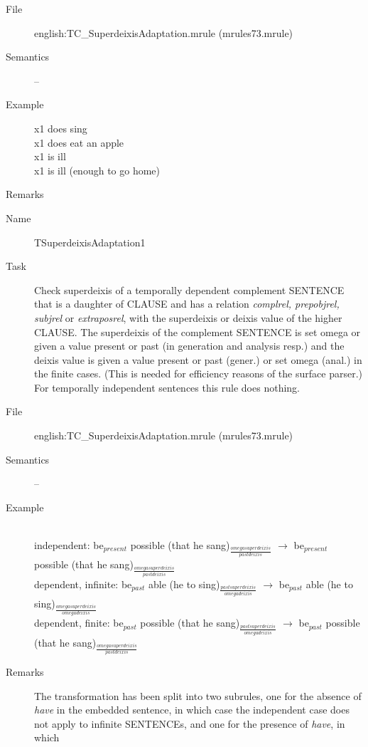 \begin{description}
\begin{description}
\item[File] english:TC\_SuperdeixisAdaptation.mrule (mrules73.mrule)
\item[Semantics] --
\item[Example] x1 does sing\\
x1 does eat an apple\\
x1 is ill\\
x1 is ill (enough to go home)
\item[Remarks] 
\end{description}

\vspace{1 cm}
\begin{description}
\item[Name] TSuperdeixisAdaptation1
\item[Task] 
Check superdeixis of a temporally dependent complement SENTENCE that is a 
daughter of CLAUSE and has a relation {\em complrel, prepobjrel, subjrel\/} or 
{\em extraposrel}, with the superdeixis or deixis value of the higher CLAUSE.
The superdeixis of the complement SENTENCE is set omega or given a 
value present or past (in generation and analysis resp.) and the deixis value 
is given a value present or past (gener.) or
set omega (anal.) in the finite cases. (This is needed for efficiency 
reasons of the surface parser.) For temporally independent sentences this rule 
does nothing.
\item[File] english:TC\_SuperdeixisAdaptation.mrule (mrules73.mrule)
\item[Semantics] --
\item[Example] \mbox{}\\
independent: be$_{present}$ possible (that he 
sang)$_{\frac{omegasuperdeixis}{pastdeixis}}$ $\rightarrow$
be$_{present}$ possible (that he sang)$_{\frac{omegasuperdeixis}{pastdeixis}}$ 
\\
dependent, infinite: be$_{past}$ able (he 
to sing)$_{\frac{pastsuperdeixis}{omegadeixis}}$ $\rightarrow$
be$_{past}$ able (he to sing)$_{\frac{omegasuperdeixis}{omegadeixis}}$ 
\\
dependent, finite: be$_{past}$ possible (that
he sang)$_{\frac{pastsuperdeixis}{omegadeixis}}$ $\rightarrow$
be$_{past}$ possible (that he sang)$_{\frac{omegasuperdeixis}{pastdeixis}}$ 
\item[Remarks] 
 The transformation has been split into two subrules, one for the 
absence of {\em have} in the embedded sentence, in which case the independent 
case does not apply 
to infinite SENTENCEs, and one for the presence of {\em have}, in which 

\end{description}
\end{description}
